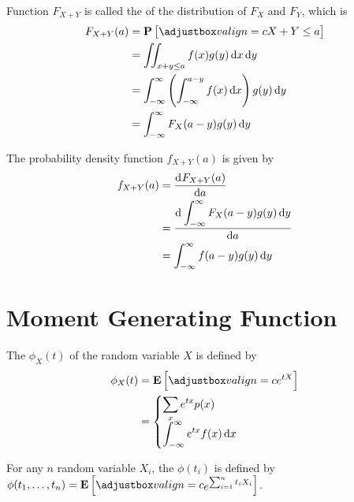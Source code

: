 \begin{definition}
    Function $F_{X+Y}$ is called the  of the distribution of $F_X$ and $F_Y$, which is
    \begin{equation}
        \begin{aligned}
            F_{X+Y}(a) &= \probability{X + Y \leq a} \\
            &= \iint_{x+y \leq a} f(x) g(y) \dif{x} \dif{y} \\
            &= \int_{-\infty}^\infty \left( \int_{-\infty}^{a - y} f(x) \dif{x} \right) g(y) \dif{y} \\
            &= \int_{-\infty}^\infty F_X (a-y)g(y) \dif{y}
        \end{aligned}
    \end{equation}
    
    The probability density function $f_{X+Y}(a)$ is given by 
    \begin{equation}
        \begin{aligned}
            f_{X+Y}(a) &= \dod{F_{X+Y}(a)}{a} \\
            &= \dod{\displaystyle \int_{-\infty}^\infty F_X (a-y)g(y) \dif{y}}{a} \\
            &= \int_{-\infty}^{\infty} f(a-y) g(y) \dif{y}
        \end{aligned}
    \end{equation}
\end{definition}




\section{Moment Generating Function}

\begin{definition}
    The  $\phi_X (t)$ of the random variable $X$ is defined by
    \begin{equation}
        \begin{aligned}
            \phi_X (t) &= \expect{e^{tX}} \\
            &= \begin{cases}
                 \displaystyle \sum_x e^{tx} p(x)\\
                 \displaystyle \int_{-\infty}^\infty e^{tx} f(x) \dif{x}
            \end{cases}
        \end{aligned}
    \end{equation}
    
    For any $n$ random variable $X_i$, the  $\phi(t_i)$ is defined by $\phi(t_1, \dots, t_n) = \expect{ e^{ \sum_{i=1}^n t_i X_i}}$.
\end{definition}

